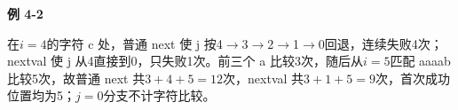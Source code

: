{\color{ink}\bfseries 例 4-2}\par\vspace{1bp}在\(i=\allowbreak{}4\)的字符 c 处，普通 next 使 j 按4\(\to \)3\(\to \)2\(\to \)1\(\to \)0回退，连续失败4次；nextval 使 j 从4直接到0，只失败1次。前三个 a 比较3次，随后从\(i=\allowbreak{}5\)匹配 aaaab 比较5次，故普通 next 共\(3+\allowbreak{}4+\allowbreak{}5=\allowbreak{}12\)次，nextval 共\(3+\allowbreak{}1+\allowbreak{}5=\allowbreak{}9\)次，首次成功位置均为5；\(j=\allowbreak{}0\)分支不计字符比较。
